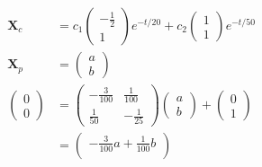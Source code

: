 \documentclass{article}
\begin{document}
\begin{enumerate}
        \begin{align*}
          \mathbf{X}_c    & = c_1 \begin{pmatrix}
                                    -\frac{1}{2} \\
                                    1
                                  \end{pmatrix} e^{-t / 20} + c_2 \begin{pmatrix}
                                                                    1 \\
                                                                    1
                                                                  \end{pmatrix} e^{-t / 50}                                      \\
          \mathbf{X}_p    & = \begin{pmatrix}
                                a \\
                                b
                              \end{pmatrix}                                                                                     \\
          \begin{pmatrix}
            0 \\
            0
          \end{pmatrix} & = \begin{pmatrix}
                              -\frac{3}{100} & \frac{1}{100} \\
                              \frac{1}{50}   & -\frac{1}{25}
                            \end{pmatrix} \begin{pmatrix}
                                            a \\
                                            b
                                          \end{pmatrix} + \begin{pmatrix}
                                                            0 \\
                                                            1
                                                          \end{pmatrix}                                                         \\
                          & = \begin{pmatrix}
                                -\frac{3}{100} a + \frac{1}{100} b \\

\end{pmatrix}
\end{align*}
\end{enumerate}
\end{document}
